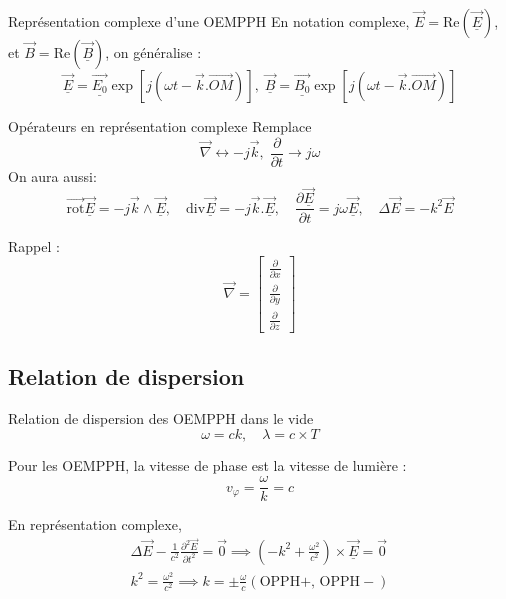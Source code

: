 \begin{Prop}{Représentation complexe d'une OEMPPH}{}
En notation complexe, $\overrightarrow{E}  = \mathrm{Re} (\overrightarrow{\underline{E}} )$, et $\overrightarrow{B} = \mathrm{Re} (\overrightarrow{\underline{B}}) $, on généralise :
\[
    \overrightarrow{\underline{E}}  = \overrightarrow{\underline{E_0}} \exp [j( \omega t - \overrightarrow{k} .\overrightarrow{OM} )],\;
    \overrightarrow{\underline{B}}  = \overrightarrow{\underline{B_0}} \exp [j( \omega t - \overrightarrow{k} .\overrightarrow{OM} )] 
\]
\end{Prop}

\begin{Prop}{Opérateurs en représentation complexe}{}
Remplace 
\[
  \overrightarrow{\nabla } \longleftrightarrow -j\overrightarrow{k}, \; \frac{\partial }{\partial t} \to j \omega
\]
On aura aussi: 
\[
    \overrightarrow{\mathrm{rot} } \overrightarrow{\underline{E}}  = -j \overrightarrow{k} \wedge \overrightarrow{\underline{E}} , \quad \mathrm{div} \overrightarrow{\underline{E}} = -j \overrightarrow{k} . \overrightarrow{\underline{E}} , \quad \frac{\partial \overrightarrow{\underline{E}} }{\partial t}  = j \omega \overrightarrow{\underline{E}} , \quad \Delta \overrightarrow{E}  = - k^{2}\overrightarrow{E}
\]
\end{Prop}

\begin{myproof}{}{}
Rappel :
\[
\overrightarrow{\nabla }  = \begin{bmatrix} \frac{\partial }{\partial x} \\ \frac{\partial }{\partial y} \\ \frac{\partial }{\partial z}  \end{bmatrix}
\]
\end{myproof}


\subsection{Relation de dispersion}

\begin{Prop}{Relation de dispersion des OEMPPH dans le vide}{}
\[
\omega = ck,\quad \lambda = c\times T
\]

Pour les OEMPPH, la vitesse de phase est la vitesse de lumière :
\[
  v_\varphi = \frac{ \omega }{k} =c
\]

\end{Prop}
\begin{myproof}
En représentation complexe, 
\begin{gather*}
    \Delta \overrightarrow{E}  - \frac{1}{c^{2}}  \frac{\partial ^{2}\overrightarrow{E} }{\partial t ^{2}}  = \overrightarrow{0}  \implies \left( -k^{2}+ \frac{ \omega ^{2}}{c^{2}}  \right) \times \overrightarrow{\underline{E}}  = \overrightarrow{0} \\
    k^{2} = \frac{ \omega ^{2}}{c^{2}}  \implies k = \pm \frac{\omega}{c} (\text{OPPH+, OPPH}-)
\end{gather*}
\end{myproof}

